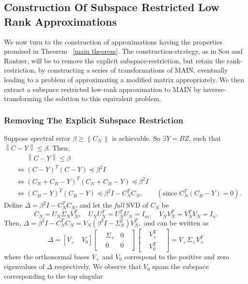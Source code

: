\documentclass[11pt]{article}
\renewcommand{\math}[1]{$#1$}
\newcommand{\norm}[1]{\left\|#1\right\|}
\newcommand{\Leq}{\preceq}
\newcommand{\N}{\mathcal{N}}
\begin{document}
\subsection{Construction Of Subspace Restricted Low Rank Approximations}
We now turn to the construction of approximations having the properties promised in Theorem~ \ref{main theorem}. The construction-strategy, as in Sou and Rantzer, will be to remove the explicit subspace-restriction, but retain the rank-restriction, by constructing a series of transformations of MAIN, eventually leading to a problem of approximating a modified matrix appropriately. We then extract a subspace restricted low-rank approximation to MAIN by inverse-transforming the solution to this equivalent problem.

\subsubsection{Removing The Explicit Subspace Restriction}
Suppose spectral error $\beta \geq \norm{C_{\N}}$ is achievable. So
 $\exists Y = BZ$, such that $\norm{C - Y} \leq \beta$. Then,
\begin{align*}
&\phantom{\iff}\norm{C - Y} \leq \beta \\[3pt]
& \iff \left( {C} - {Y} \right)^T \left( {C} - {Y} \right) 
\Leq \beta^2 I \\
& \iff \left( {C}_N + {C}_B - {Y} \right)^T \left( {C}_N + {C}_B - {Y} \right) \Leq \beta^2 I \\
& \iff \left( {C}_B - {Y} \right)^T \left( {C}_B - {Y} \right) \Leq \beta^2 I - {C}_N ^T {C}_N, \qquad (\text{since }  {C}_N^T({C}_B - {Y})=0).
\end{align*}
Define 
$\Delta = \beta^2 I - {C}_N ^T {C}_N$, and let the \emph{full} SVD of $C_N$ be 
\[ C_N = U_N\Sigma_NV_N^T, \quad U_NU_N^T=U_N^TU_N=I_m, \quad V_NV_N^T = V_N^TV_N = I_n. \]
Then, $\Delta = \beta^2 I - {C}_N ^T {C}_N = V_N(\beta^2I - \Sigma_N^2)V_N^T,$ and can be written as
\[ \Delta =  [  V_+ \quad V_0  ]
\begin{bmatrix}
&\Sigma_+ & 0 &\\
&0 & 0&
\end{bmatrix}
\begin{bmatrix}
&V_+^{\text{T}}&\\
&V_0^{\text{T}}&
\end{bmatrix} = V_+ \Sigma_+ V_+^T \]
where the orthonormal bases $V_+$ and $V_0$ correspond to the positive and zero eigenvalues of $\Delta$ respectively. We observe that
\math{V_0} spans the subspace corresponding to the top singular
\end{document}
